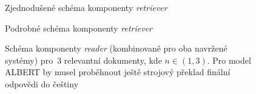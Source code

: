\begin{figure}[hbt]
	\centering
	\caption{Zjednodušené schéma komponenty \emph{retriever}}
	\label{retriever-simple-scheme}
\end{figure}

\begin{figure}[H]
    \centering
	\caption{Podrobné schéma komponenty \emph{retriever}}
	\label{retriever-podrobne}
\end{figure}

\begin{figure}[hbt]
	\centering
	\caption{Schéma komponenty \emph{reader} (kombinovaně pro oba navržené systémy) pro~3 relevantní dokumenty, kde $n \in (1,3)$. Pro model ALBERT by musel proběhnout ještě strojový překlad finální odpovědi do češtiny}
	\label{reader_schema}
\end{figure}

